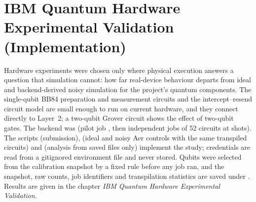 \section{IBM Quantum Hardware Experimental Validation (Implementation)}
Hardware experiments were chosen only where physical execution answers a question that simulation cannot: how far real-device behaviour departs from ideal and backend-derived noisy simulation for the project's quantum components. The single-qubit BB84 preparation and measurement circuits and the intercept--resend circuit model are small enough to run on current hardware, and they connect directly to Layer~2; a two-qubit Grover circuit shows the effect of two-qubit gates. The backend was \HwBackend{} (pilot job \HwPilotJob{}, then \HwJobs{} independent jobs of 52 circuits at \HwShots{} shots). The scripts  (submission),  (ideal and noisy Aer controls with the same transpiled circuits) and  (analysis from saved files only) implement the study; credentials are read from a gitignored environment file and never stored. Qubits were selected from the calibration snapshot by a fixed rule before any job ran, and the snapshot, raw counts, job identifiers and transpilation statistics are saved under . Results are given in the chapter \emph{IBM Quantum Hardware Experimental Validation}.
